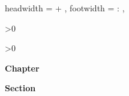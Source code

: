 
\usepackage
[
]
{scrlayer-scrpage} %

\clearpairofpagestyles


\KOMAoptions
{%
    headwidth = \textwidth + \mymarginwidthwithinnersep,%
    footwidth = \myoutermargin : \textwidth,%
}

\renewcommand*{\chaptermarkformat}{\normalfont\sffamily\small\color{footerchaptername}}
\renewcommand*{\sectionmarkformat}{\normalfont\sffamily\small\color{footersectionname}}

\automark*[section]{}


\lehead%
{%
    \begin{minipage}[b]{\mymarginwidth}%
        \ifnum\value{chapter}>0
            \small\raggedleft\normalfont\textsf{\textbf{\color{footerchapter}\chaptername\ \thechapter}}
        \fi
    \end{minipage}
}
\cehead{\hspace*{\mymarginwidthwithinnersep}\parbox{\textwidth}{\raggedright\leftmark}}

\rohead%
{%
    \Ifstr{\rightmark}{\leftmark}%
    {%
        \begin{minipage}[b]{\mymarginwidth}%
            \ifnum\value{chapter}>0
                \small\raggedright\normalfont\textsf{\textbf{\color{footersection}Chapter\ \thechapter}}%
            \fi
        \end{minipage}%
    }%
    {%
        \begin{minipage}[b]{\mymarginwidth}%
            \small\raggedright\normalfont\textsf{\textbf{\color{footersection}Section\ \thesection}}%
        \end{minipage}%
    }%
}
\cohead{\hspace*{-\mymarginwidthwithinnersep}\parbox{\textwidth}{\raggedleft\rightmark}}

